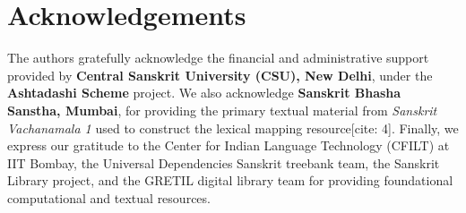 \documentclass[11pt,a4paper]{article}
\begin{document}
\section*{Acknowledgements}
The authors gratefully acknowledge the financial and administrative support provided by \textbf{Central Sanskrit University (CSU), New Delhi}, under the \textbf{Ashtadashi Scheme} project. We also acknowledge \textbf{Sanskrit Bhasha Sanstha, Mumbai}, for providing the primary textual material from \textit{Sanskrit Vachanamala 1} used to construct the lexical mapping resource[cite: 4]. Finally, we express our gratitude to the Center for Indian Language Technology (CFILT) at IIT Bombay, the Universal Dependencies Sanskrit treebank team, the Sanskrit Library project, and the GRETIL digital library team for providing foundational computational and textual resources.



\end{document}
